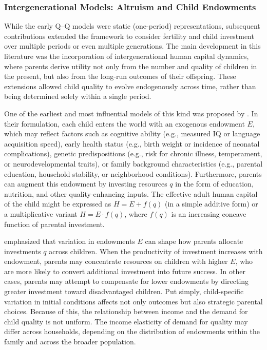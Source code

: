 \documentclass[]{AEA}
\begin{document}
\subsubsection{Intergenerational Models: Altruism and Child Endowments}

While the early Q--Q models were static (one-period) representations,
subsequent contributions extended the framework to consider fertility
and child investment over multiple periods or even multiple generations.
The main development in this literature was the incorporation of
intergenerational human capital dynamics, where parents derive utility
not only from the number and quality of children in the present, but
also from the long-run outcomes of their offspring. These extensions
allowed child quality to evolve endogenously across time, rather than
being determined solely within a single period.

One of the earliest and most influential models of this kind was
proposed by \citet{becker1976child}. In their formulation, each child
enters the world with an exogenous endowment \(E\), which may reflect
factors such as cognitive ability (e.g., measured IQ or language
acquisition speed), early health status (e.g., birth weight or incidence
of neonatal complications), genetic predispositions (e.g., risk for
chronic illness, temperament, or neurodevelopmental traits), or family
background characteristics (e.g., parental education, household
stability, or neighborhood conditions). Furthermore, parents can augment
this endowment by investing resources \(q\) in the form of education,
nutrition, and other quality-enhancing inputs. The effective adult human
capital of the child might be expressed as \(H = E + f(q)\) (in a simple
additive form) or a multiplicative variant \(H = E \cdot f(q)\), where
\(f(q)\) is an increasing concave function of parental investment.

\citet{becker1976child} emphasized that variation in endowments \(E\)
can shape how parents allocate investments \(q\) across children. When
the productivity of investment increases with endowment, parents may
concentrate resources on children with higher \(E\), who are more likely
to convert additional investment into future success. In other cases,
parents may attempt to compensate for lower endowments by directing
greater investment toward disadvantaged children. Put simply,
child-specific variation in initial conditions affects not only outcomes
but also strategic parental choices. Because of this, the relationship
between income and the demand for child quality is not uniform. The
income elasticity of demand for quality may differ across households,
depending on the distribution of endowments within the family and across
the broader population.
\end{document}
